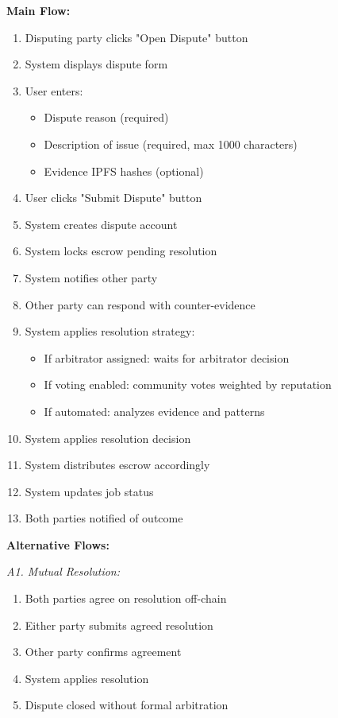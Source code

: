 \documentclass[a4paper,13pt,twoside]{report}
\theoremstyle{definition}
\begin{document}
\textbf{Main Flow:}
\begin{enumerate}
    \item Disputing party clicks "Open Dispute" button
    \item System displays dispute form
    \item User enters:
    \begin{itemize}
        \item Dispute reason (required)
        \item Description of issue (required, max 1000 characters)
        \item Evidence IPFS hashes (optional)
    \end{itemize}
    \item User clicks "Submit Dispute" button
    \item System creates dispute account
    \item System locks escrow pending resolution
    \item System notifies other party
    \item Other party can respond with counter-evidence
    \item System applies resolution strategy:
    \begin{itemize}
        \item If arbitrator assigned: waits for arbitrator decision
        \item If voting enabled: community votes weighted by reputation
        \item If automated: analyzes evidence and patterns
    \end{itemize}
    \item System applies resolution decision
    \item System distributes escrow accordingly
    \item System updates job status
    \item Both parties notified of outcome
\end{enumerate}

\textbf{Alternative Flows:}

\textit{A1. Mutual Resolution:}
\begin{enumerate}
    \item Both parties agree on resolution off-chain
    \item Either party submits agreed resolution
    \item Other party confirms agreement
    \item System applies resolution
    \item Dispute closed without formal arbitration
\end{enumerate}
\end{document}
